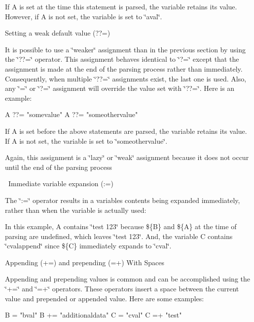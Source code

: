 \begin{DoxyItemize}
\begin{DoxyItemize}
\item If A is set at the time this statement is parsed, the variable retains its value. However, if A is not set, the variable is set to \char`\"{}aval\char`\"{}.
\end{DoxyItemize}
\item Setting a weak default value (??=)
\begin{DoxyItemize}
\item It is possible to use a \char`\"{}weaker\char`\"{} assignment than in the previous section by using the \char`\"{}??=\char`\"{} operator. This assignment behaves identical to \char`\"{}?=\char`\"{} except that the assignment is made at the end of the parsing process rather than immediately. Consequently, when multiple \char`\"{}??=\char`\"{} assignments exist, the last one is used. Also, any \char`\"{}=\char`\"{} or \char`\"{}?=\char`\"{} assignment will override the value set with \char`\"{}??=\char`\"{}. Here is an example\+: 
\begin{DoxyCode}
A ??= "somevalue"
A ??= "someothervalue"
\end{DoxyCode}

\item If A is set before the above statements are parsed, the variable retains its value. If A is not set, the variable is set to \char`\"{}someothervalue\char`\"{}.
\item Again, this assignment is a \char`\"{}lazy\char`\"{} or \char`\"{}weak\char`\"{} assignment because it does not occur until the end of the parsing process
\end{DoxyItemize}
\item  \+Immediate variable expansion (\+:=)
\begin{DoxyItemize}
\item The \char`\"{}\+:=\char`\"{} operator results in a variable\textquotesingle{}s contents being expanded immediately, rather than when the variable is actually used\+: 

\item In this example, A contains \char`\"{}test 123\char`\"{} because \$\{B\} and \$\{A\} at the time of parsing are undefined, which leaves \char`\"{}test 123\char`\"{}. And, the variable C contains \char`\"{}cvalappend\char`\"{} since \$\{C\} immediately expands to \char`\"{}cval\char`\"{}.
\end{DoxyItemize}
\item Appending (+=) and prepending (=+) With Spaces
\begin{DoxyItemize}
\item Appending and prepending values is common and can be accomplished using the \char`\"{}+=\char`\"{} and \char`\"{}=+\char`\"{} operators. These operators insert a space between the current value and prepended or appended value. Here are some examples\+: 
\begin{DoxyCode}
B = "bval"
B += "additionaldata"
C = "cval"
C =+ "test"
\end{DoxyCode}


\end{DoxyItemize}
\end{DoxyItemize}
